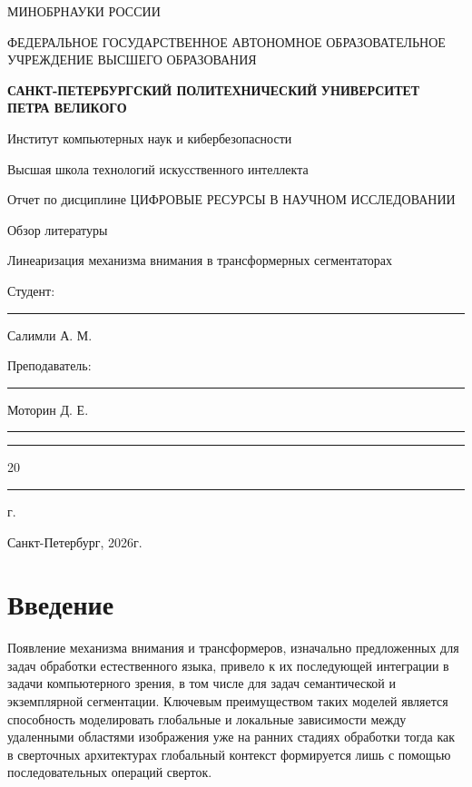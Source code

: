 \documentclass[areasetadvanced]{scrartcl}
\begin{document}
\sloppy
	\thispagestyle{empty}
	\begin{center}
		\large{МИНОБРНАУКИ РОССИИ} \par
		\vspace{0.3cm}
		\normalsize
		{ФЕДЕРАЛЬНОЕ ГОСУДАРСТВЕННОЕ АВТОНОМНОЕ ОБРАЗОВАТЕЛЬНОЕ УЧРЕЖДЕНИЕ ВЫСШЕГО ОБРАЗОВАНИЯ} \par
		\vspace{0.3cm}
		\textbf{\guillemotleft САНКТ-ПЕТЕРБУРГСКИЙ ПОЛИТЕХНИЧЕСКИЙ}
		\textbf{УНИВЕРСИТЕТ ПЕТРА ВЕЛИКОГО\guillemotright} \par
		\vspace{0.3cm}
		{Институт компьютерных наук и кибербезопасности}\par
		{Высшая школа технологий искусственного интеллекта}\par
	\end{center}
	\vfill
	\begin{center}
		{\large Отчет по дисциплине \guillemotleft ЦИФРОВЫЕ РЕСУРСЫ В НАУЧНОМ ИССЛЕДОВАНИИ\guillemotright}\par
		
		 Обзор литературы \par
            {\huge \guillemotleft Линеаризация механизма внимания в трансформерных сегментаторах\guillemotright}
         
	\end{center}
	\vfill
	\begin{flushleft}
		Студент: \hspace{1.8cm} \rule[0pt]{2.5cm}{0.5pt}\hfill Салимли А. М.\par
		\vspace{1.5cm}
		Преподаватель: \hspace{0.55cm} \rule[0pt]{2.5cm}{0.5pt}\hfill  Моторин Д. Е.
	\end{flushleft}
	\vspace{0.5cm}
	\begin{flushright}
		\guillemotleft \rule[0pt]{0.8cm}{0.5pt}\guillemotright \rule[0pt]{2cm}{0.5pt} 20\rule[0pt]{0.5cm}{0.5pt} г.
	\end{flushright}
	\vfill
	\begin{center}
		Санкт-Петербург, 2026г.
	\end{center}
	\newpage
	\tableofcontents
	\newpage
\section*{Введение}
	Появление механизма внимания и трансформеров, изначально предложенных для задач обработки 
	естественного языка, привело к их последующей интеграции в задачи компьютерного зрения, в том числе для задач 
	семантической и экземплярной сегментации. Ключевым преимуществом таких моделей является способность
	моделировать глобальные и локальные зависимости между удаленными областями изображения уже
	на ранних стадиях обработки тогда как в сверточных архитектурах глобальный
	контекст формируется лишь с помощью последовательных операций сверток.
\end{document}
